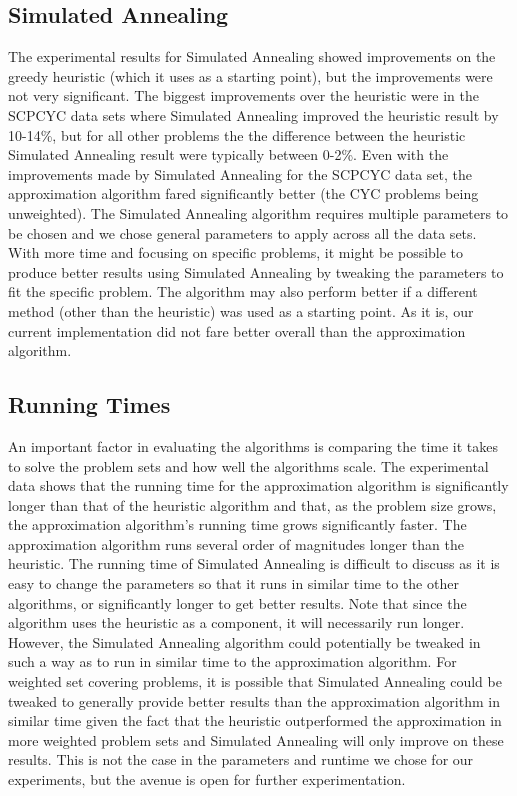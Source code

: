\documentclass{report}
\begin{document}
\subsection{Simulated Annealing}
The experimental results for Simulated Annealing showed improvements on the greedy heuristic (which it uses as a starting point), but the improvements were not very significant. The biggest improvements over the heuristic were in the SCPCYC data sets where Simulated Annealing improved the heuristic result by 10-14\%, but for all other problems the the difference between the heuristic Simulated Annealing result were typically between 0-2\%. Even with the improvements made by Simulated Annealing for the SCPCYC data set, the approximation algorithm fared significantly better (the CYC problems being unweighted). The Simulated Annealing algorithm requires multiple parameters to be chosen and we chose general parameters to apply across all the data sets. With more time and focusing on specific problems, it might be possible to produce better results using Simulated Annealing by tweaking the parameters to fit the specific problem. The algorithm may also perform better if a different method (other than the heuristic) was used as a starting point. As it is, our current implementation did not fare better overall than the approximation algorithm.

\subsection{Running Times}
An important factor in evaluating the algorithms is comparing the time it takes to solve the problem sets and how well the algorithms scale. The experimental data shows that the running time for the approximation algorithm is significantly longer than that of the heuristic algorithm and that, as the problem size grows, the approximation algorithm's running time grows significantly faster. The approximation algorithm runs several order of magnitudes longer than the heuristic.
The running time of Simulated Annealing is difficult to discuss as it is easy to change the parameters so that it runs in similar time to the other algorithms, or significantly longer to get better results. Note that since the algorithm uses the heuristic as a component, it will necessarily run longer. However, the Simulated Annealing algorithm could potentially be tweaked in such a way as to run in similar time to the approximation algorithm. For weighted set covering problems, it is possible that Simulated Annealing could be tweaked to generally provide better results than the approximation algorithm in similar time given the fact that the heuristic outperformed the approximation in more weighted problem sets and Simulated Annealing will only improve on these results. This is not the case in the parameters and runtime we chose for our experiments, but the avenue is open for further experimentation.
\end{document}
